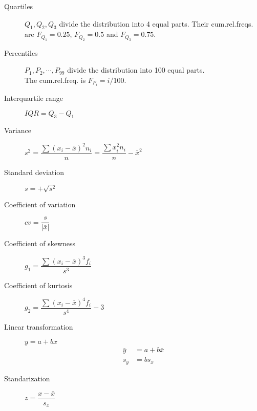 \begin{multicols*}{2}
	\begin{tcolorbox}[hbox, title=Position statistics]
		\begin{minipage}{0.4\textwidth}
			\begin{description}
				\item [Quartiles] $Q_1,Q_2,Q_3$ divide the distribution into 4 equal parts.
				      Their cum.rel.freqs. are
				      $F_{Q_1}=0.25$, $F_{Q_2}=0.5$ and $F_{Q_3}=0.75$.
				\item [Percentiles] $P_1,P_2,\cdots,P_{99}$ divide the distribution into 100 equal parts.\\
				      The cum.rel.freq. is $F_{P_i}=i/100$.
			\end{description}
		\end{minipage}
	\end{tcolorbox}

	\begin{tcolorbox}[hbox, title=Dispersion statistics]
		\begin{minipage}{0.4\textwidth}
			\begin{description}
				\item [Interquartile range] $IQR=Q_3-Q_1$
				\item [Variance] $s^2=\dfrac{\sum (x_i-\bar x)^2n_i}{n}=\dfrac{\sum x_i^2n_i}{n}-\bar x^2$
				\item [Standard deviation] $s=+\sqrt{s^2}$
				\item [Coefficient of variation] $cv=\dfrac{s}{|\bar{x}|}$
			\end{description}
		\end{minipage}
	\end{tcolorbox}

	\begin{tcolorbox}[hbox, title=Shape statistics]
		\begin{minipage}{0.4\textwidth}
			\begin{description}
				\item [Coefficient of skewness] $g_1=\dfrac{\sum(x_i-\bar{x})^3f_i}{s^3}$
				\item [Coefficient of kurtosis] $g_2=\dfrac{\sum(x_i-\bar{x})^4f_i}{s^4}-3$
			\end{description}
		\end{minipage}
	\end{tcolorbox}

	\begin{tcolorbox}[hbox, title=Linear transformations]
		\begin{minipage}{0.4\textwidth}
			\begin{description}
				\item[Linear transformation] $y=a+bx$
				      \begin{align*}
					      \bar y & = a+b\bar x \\
					      s_y    & = bs_x
				      \end{align*}
				\item[Standarization] $z=\dfrac{x-\bar x}{s_x}$
			\end{description}
		\end{minipage}
	\end{tcolorbox}



\end{multicols*}
